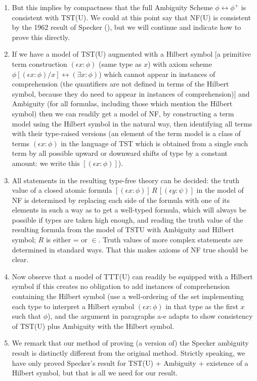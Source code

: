 \documentclass[112pt]{article}
\begin{document}
\begin{description}
\begin{enumerate}
\begin{enumerate}
\item But this implies by compactness that the full Ambiguity Scheme $\phi \leftrightarrow \phi^+$ is consistent with TST(U).  We could at this point say that  NF(U) is consistent by the 1962 result of Specker (\cite{ambiguity}), but we will continue and indicate how to prove this directly.

\item If we have a model of TST(U) augmented with a Hilbert symbol [a primitive term construction $(\epsilon x:\phi)$ (same type as $x$) with axiom scheme $\phi[(\epsilon x:\phi)/x] \leftrightarrow (\exists x:\phi)$) which cannot appear in instances of comprehension (the quantifiers are not defined in terms of the Hilbert symbol, because they do need to appear in instances of comprehension)] and Ambiguity (for all formulas, including those which mention the Hilbert symbol) then we can readily get a model of NF, by constructing a term model using the Hilbert symbol in the natural way, then identifying all terms with their type-raised versions (an element of the term model is a class of terms $(\epsilon x:\phi)$ in the language of TST which is obtained from a single such term by all possible upward or downward shifts of type by a constant amount:  we write this
$[(\epsilon x:\phi)]$).


\item All statements in the resulting type-free theory can be decided:  the truth value of a closed atomic formula $[(\epsilon x:\phi)] \,R\, [(\epsilon y:\psi)]$ in the model of NF is determined by replacing each side of the formula with one of its elements in such a way as to get a well-typed formula, which will always be possible if types are taken high enough, and reading the truth value of the resulting formula  from the model of TSTU with Ambiguity and Hilbert symbol;  $R$ is either = or $\in$.  Truth values of more complex statements are determined in standard ways.  That this makes axioms of NF true should be clear.

\item  Now observe that a model of TTT(U) can readily be equipped with a Hilbert symbol if this creates no obligation to add instances of comprehension
containing the Hilbert symbol (use a well-ordering of the set implementing each type to interpret a Hilbert symbol  $(\epsilon x:\phi)$ in that type as the first $x$ such that $\phi$), and the argument in paragraphs a-e adapts to show consistency of TST(U) plus Ambiguity with the Hilbert symbol.

\item  We remark that our method of proving (a version of) the Specker ambiguity result is distinctly different from the original method.  Strictly speaking, we have only proved Specker's result for TST(U) + Ambiguity + existence of a Hilbert symbol, but that is all we need for our result.


\end{enumerate}
\end{enumerate}
\end{description}
\end{document}
